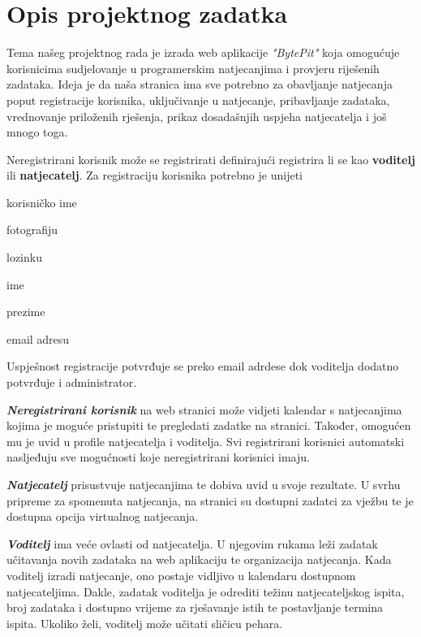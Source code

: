 \chapter{Opis projektnog zadatka}
		
		
		
		Tema našeg projektnog rada je izrada web aplikacije \textit{"BytePit"} koja omogućuje korisnicima sudjelovanje u programerskim natjecanjima i provjeru riješenih zadataka. Ideja je da naša stranica ima sve potrebno za obavljanje natjecanja poput registracije korisnika, uključivanje u natjecanje, pribavljanje zadataka, vrednovanje priloženih rješenja, prikaz dosadašnjih uspjeha natjecatelja i još mnogo toga.
	
		Neregistrirani korisnik može se registrirati definirajući registrira li se kao \textbf{voditelj} ili \textbf{natjecatelj}.
		Za registraciju korisnika potrebno je  unijeti \begin{packed_item}
			\item korisničko ime
			\item fotografiju
			\item lozinku
			\item ime
			\item prezime
			\item email adresu
		\end{packed_item}
		Uspješnost registracije potvrđuje se preko email adrdese dok  voditelja dodatno potvrđuje i administrator.
		
		\textbf{\textit{Neregistrirani korisnik}} na web stranici može vidjeti kalendar s natjecanjima kojima je moguće pristupiti te pregledati zadatke na stranici. Također, omogućen mu je uvid u profile natjecatelja i voditelja. Svi registrirani korisnici automatski nasljeđuju sve mogućnosti koje neregistrirani korisnici imaju.
		
	    \textbf{\textit{Natjecatelj}} prisustvuje natjecanjima te dobiva uvid u svoje rezultate. U svrhu pripreme za spomenuta natjecanja, na stranici su dostupni zadatci za vježbu te je dostupna opcija virtualnog natjecanja.
	    
	    \textbf{\textit{Voditelj}} ima veće ovlasti od natjecatelja. U njegovim rukama leži zadatak učitavanja novih zadataka na web aplikaciju te organizacija natjecanja. Kada voditelj izradi natjecanje, ono postaje vidljivo u kalendaru dostupnom natjecateljima. Dakle, zadatak voditelja je odrediti težinu natjecateljskog ispita, broj zadataka i dostupno vrijeme za rješavanje istih te postavljanje termina ispita. Ukoliko želi, voditelj može učitati sličicu pehara.  
	    

